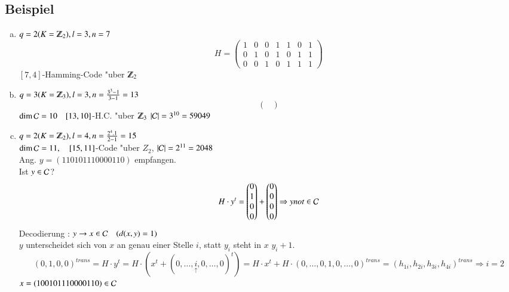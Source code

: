 \subsection{Beispiel}
\begin{enumerate}[a)]
	\item $q=2 (K= \Z_2), l=3, n=7$
	\[
	H=\begin{pmatrix}
		1 & 0 & 0 & 1 & 1 & 0 & 1 \\ 
		0 & 1 & 0 & 1 & 0 & 1 & 1 \\ 
		0 & 0 & 1 & 0 & 1 & 1 & 1
	\end{pmatrix}
	\]
	$[7,4]$-Hamming-Code "uber $\Z_2$
	\item  $q=3 (K= \Z_3), l=3, n=\frac{3^3-1}{3-1}=13$
	\[
	\begin{pmatrix}
	\end{pmatrix}
	\]
	$\dim \mathcal{C} = 10\quad [13,10]$-H.C. "uber $\Z_3$ $\left| \mathcal{C} \right| =3^{10}=59049$
	\item
	$q=2 (K= \Z_2), l=4, n=\frac{2^4.1}{2-1}=15$
	\[
	\]
	$\dim \mathcal{C} =11,\quad [15,11]$-Code "uber $Z_2$, $\left| \mathcal{C} \right| = 2^{11}=2048$\\
	Ang. $y=(110101110000110)$ empfangen.\\
	Ist $y \in \mathcal{C}$? 
	\[
		H \cdot y^t = 
		\begin{pmatrix}
			0 \\ 
			1 \\ 
			0 \\ 
			0
		\end{pmatrix} +
		\begin{pmatrix}
			0 \\ 
			0 \\ 
			0 \\ 
			0
		\end{pmatrix}
		\Rightarrow y  not \in \mathcal{C}
	\]
	Decodierung : $y \rightarrow x \in \mathcal{C}\quad (d(x,y)=1)$\\
	$y$ unterscheidet sich von $x$ an genau einer Stelle $i$, statt $y_i$ steht in $x$ $y_i+1$.
	\[
		(0,1,0,0)^{trans}=H\cdot y^t=H\cdot (x^t + (0,\ldots,\underset{\uparrow}{i},0,\ldots,0)^t) = H \cdot x^t + H \cdot (0,\ldots,0,1,0,\ldots,0)^{trans} = (h_{1i},h_{2i},h_{3i},h_{4i})^{trans} \Rightarrow i=2
	\]
	$x=(100101110000110) \in \mathcal{C}$
\end{enumerate}
